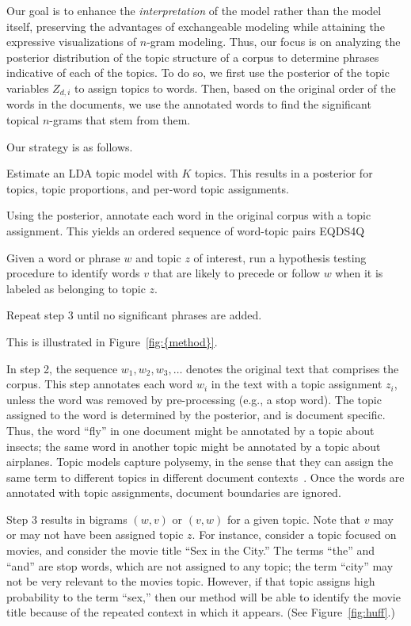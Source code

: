 \documentclass[11pt]{article}
\newenvironment{packed_enumerate}{
  \begin{enumerate}
    \setlength{\topsep}{0pt}
    \setlength{\itemsep}{6pt}
    \setlength{\parskip}{0pt}
    \setlength{\parsep}{0pt}
}\end{enumerate}
\begin{document}
Our goal is to enhance the \textit{interpretation} of the model rather
than the model itself, preserving the advantages of exchangeable
modeling while attaining the expressive visualizations of $n$-gram
modeling.  Thus, our focus is on analyzing the posterior distribution
of the topic structure of a corpus to determine phrases indicative of
each of the topics.  To do so, we first use the posterior of the topic
variables $Z_{d,i}$ to assign topics to words.  Then, based on the
original order of the words in the documents, we use the annotated
words to find the significant topical $n$-grams that stem from them.

Our strategy is as follows.
\begin{packed_enumerate}
\item Estimate an LDA topic model with $K$ topics.  This results in a
  posterior for topics, topic proportions, and per-word topic
  assignments.

\item Using the posterior, annotate each word in the original corpus
  with a topic assignment.  This yields an ordered sequence of
  word-topic pairs
  EQDS4Q

\item Given a word or phrase $w$ and topic $z$ of interest, run a
  hypothesis testing procedure to identify words $v$ that are likely
  to precede or follow $w$ when it is labeled as belonging to topic
  $z$.

\item Repeat step 3 until no significant phrases are added.
\end{packed_enumerate}
This is illustrated in {Figure~\ref{fig:{method}}}.

In step 2, the sequence $w_1, w_2, w_3,\ldots $ denotes the original
text that comprises the corpus.  This step annotates each word $w_i$
in the text with a topic assignment $z_i$, unless the word was removed
by pre-processing (e.g., a stop word).  The topic assigned to the word
is determined by the posterior, and is document specific.  Thus, the
word ``fly'' in one document might be annotated by a topic about
insects; the same word in another topic might be annotated by a topic
about airplanes.  Topic models capture polysemy, in the sense that
they can assign the same term to different topics in different
document contexts~\cite{Griffiths:2006}.  Once the words are annotated
with topic assignments, document boundaries are ignored.

Step 3 results in bigrams $(w,v)$ or $(v,w)$ for a given topic.  Note
that $v$ may or may not have been assigned topic $z$. For instance,
consider a topic focused on movies, and consider the movie title ``Sex
in the City.''  The terms ``the'' and ``and'' are stop words, which
are not assigned to any topic; the term ``city'' may not be very
relevant to the movies topic.  However, if that topic assigns high
probability to the term ``sex,'' then our method will be able to
identify the movie title because of the repeated context in which it
appears.  (See Figure~\ref{fig:huff}.)
\end{document}
